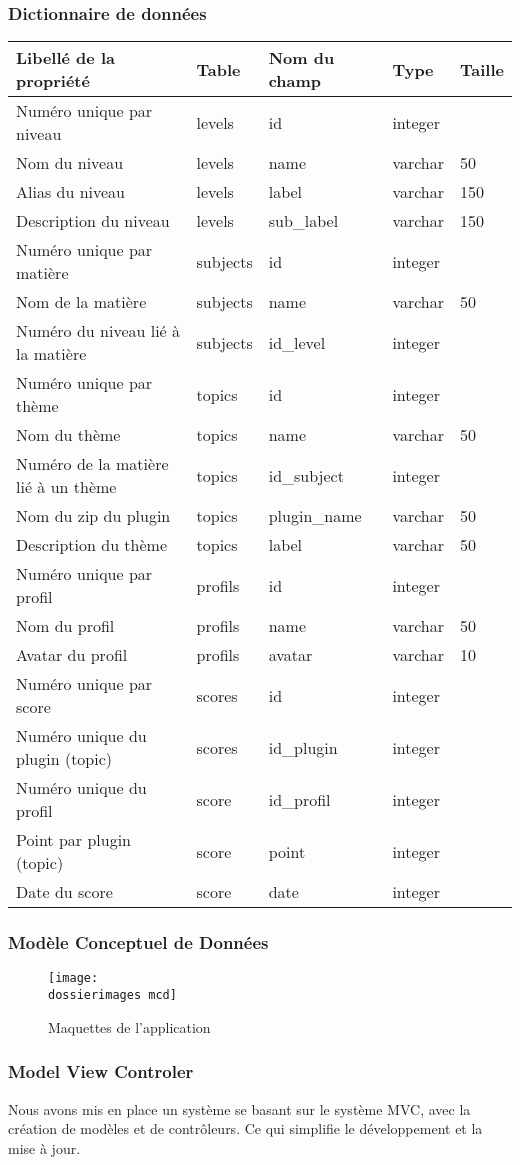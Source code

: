 \subsubsection{Dictionnaire de données}
\begin{tabbing}
\begin{tabular}{l l l l l}
	\hline
	Libellé de la propriété & Table & Nom du champ & Type & Taille \\
	\hline
	Numéro unique par niveau & levels & id & integer & \\	
	Nom du niveau & levels & name & varchar & 50 \\
	Alias du niveau & levels & label & varchar & 150 \\
	Description du niveau & levels & sub\_label & varchar & 150 \\
	Numéro unique par matière & subjects & id & integer & \\
	Nom de la matière & subjects & name & varchar & 50 \\
	Numéro du niveau lié à la matière & subjects & id\_level & integer	 & \\
	Numéro unique par thème & topics & id & integer & \\
	Nom du thème & topics & name & varchar & 50 \\
	Numéro de la matière lié à un thème & topics & id\_subject & 	integer & \\
	Nom du zip du plugin & topics & plugin\_name & varchar & 50 \\
	Description du thème & topics & label & varchar & 50 \\
	Numéro unique par profil & profils & id & integer & \\
	Nom du profil & profils & name & varchar & 50 \\
	Avatar du profil & profils & avatar & varchar & 10 \\
	Numéro unique par score & scores & id & integer & \\
	Numéro unique du plugin (topic) & scores & id\_plugin & integer & \\
	Numéro unique du profil & score & id\_profil & integer & \\
	Point par plugin (topic) & score & point & integer & \\
	Date du score & score & date & integer & \\
\end{tabular}
\end{tabbing}

\subsubsection{Modèle Conceptuel de Données}
\begin{figure}[H]
	\begin{center}
		\texttt{[image: \\dossierimages mcd]}
	\end{center}
	\caption{Maquettes de l'application}
	\label{Maquettes de l'application}
\end{figure}

\subsubsection{Model View Controler}
Nous avons mis en place un système se basant sur le système MVC, avec la création de modèles et de contr\^{o}leurs. Ce qui simplifie le développement et la mise à jour.
